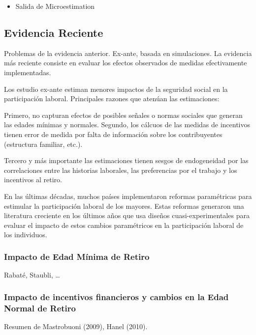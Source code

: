 \documentclass[]{article}
\providecommand{\tightlist}{%
  \setlength{\itemsep}{0pt}\setlength{\parskip}{0pt}}
\begin{document}
\begin{itemize}
\tightlist
\item
  Salida de Microestimation
\end{itemize}

\subsection{Evidencia Reciente}\label{evidencia-reciente}

Problemas de la evidencia anterior. Ex-ante, basada en simulaciones. La
evidencia más reciente consiste en evaluar los efectos observados de
medidas efectivamente implementadas.

Los estudio ex-ante estiman menores impactos de la seguridad social en
la participación laboral. Principales razones que atenúan las
estimaciones:

Primero, no capturan efectos de posibles señales o normas sociales que
generan las edades mínimas y normales. Segundo, los cálcuos de las
medidas de incentivos tienen error de medida por falta de información
sobre los contribuyentes (estructura familiar, etc.).

Tercero y más importante las estimaciones tienen sesgos de endogeneidad
por las correlaciones entre las historias laborales, las preferencias
por el trabajo y los incentivos al retiro.

En las últimas décadas, muchos países implementaron reformas
paramétricas para estimular la participación laboral de los mayores.
Estas reformas generaron una literatura creciente en los últimos años
que usa diseños cuasi-experimentales para evaluar el impacto de estos
cambios paramétricos en la participación laboral de los individuos.

\subsubsection{Impacto de Edad Mínima de
Retiro}\label{impacto-de-edad-minima-de-retiro}

Rabaté, Staubli, \ldots{}

\subsubsection{Impacto de incentivos financieros y cambios en la Edad
Normal de
Retiro}\label{impacto-de-incentivos-financieros-y-cambios-en-la-edad-normal-de-retiro}

Resumen de Mastrobuoni (2009), Hanel (2010).
\end{document}
